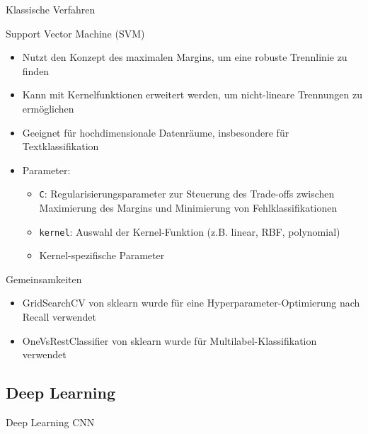 \documentclass[aspectratio=169]{beamer} %
\begin{document}
\begin{frame}{Klassische Verfahren}
    \begin{block}{Support Vector Machine (SVM)}
        \begin{itemize}
            \item Nutzt den Konzept des maximalen Margins, um eine robuste Trennlinie zu finden
            \item Kann mit Kernelfunktionen erweitert werden, um nicht-lineare Trennungen zu ermöglichen
            \item Geeignet für hochdimensionale Datenräume, insbesondere für Textklassifikation
            \item Parameter:
                  \begin{itemize}
                      \item \texttt{C}: Regularisierungsparameter zur Steuerung des Trade-offs zwischen Maximierung des Margins und Minimierung von Fehlklassifikationen
                      \item \texttt{kernel}: Auswahl der Kernel-Funktion (z.B. linear, RBF, polynomial)
                      \item Kernel-spezifische Parameter
                  \end{itemize}
        \end{itemize}
    \end{block}
\end{frame}


\begin{frame}
    \begin{block}{Gemeinsamkeiten}
        \begin{itemize}
            \item GridSearchCV von sklearn wurde für eine Hyperparameter-Optimierung nach Recall verwendet
            \item OneVsRestClassifier von sklearn wurde für Multilabel-Klassifikation verwendet
        \end{itemize}
    \end{block}
\end{frame}

\subsection{Deep Learning}

\begin{frame}{Deep Learning}
    CNN
\end{frame}
\end{document}
